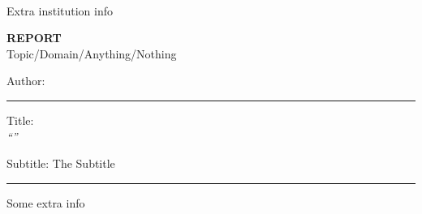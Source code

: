 \begin{titlingpage}
    \centering
    \vspace{10mm}
    \textbf{\Large \theinstitution{}}\\
    \vspace{5mm}

    {\large Extra institution info} \\
    \vspace{5mm}

    {\large
        \thelaboratory{}
        \vfill

        \textbf{REPORT} \\
        Topic/Domain/Anything/Nothing

        \vfill
        Author: \textbf{\theauthor{}}\\
        \date
        \vfill

        \par\noindent\rule{\textwidth}{0.4pt}

            {\Large     Title: \\ 
                \emph{``\thetitle''}}

            \vspace{5mm}
            
            {\large Subtitle: The Subtitle}

        \par\noindent\rule{\textwidth}{0.4pt}

    }
    \vfill

    \begin{minipage}[b]{\textwidth}\normalsize\centering
        Some extra info
    \end{minipage}
    \vfill
\end{titlingpage}

